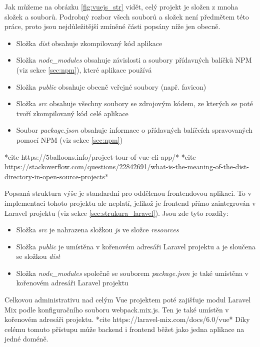 	Jak můžeme na obrázku \ref{fig:vuejs_str} vidět, celý projekt je složen z mnoha složek a souborů. Podrobný rozbor všech souborů a složek není předmětem této práce, proto jsou nejdůležitější zmíněné části popsány níže jen obecně.
	
	\begin{itemize}
		\item Složka \textit{dist} obsahuje zkompilovaný kód aplikace
		\item Složka \textit{node\_modules} obsahuje závislosti a soubory přídavných balíčků NPM (viz sekce \ref{sec:npm}), které aplikace používá
		\item Složka \textit{public} obsahuje obecně veřejné soubory (např. favicon)
		\item Složka \textit{src} obsahuje všechny soubory se zdrojovým kódem, ze kterých se poté tvoří zkompilovaný kód celé aplikace
		\item Soubor \textit{package.json} obsahuje informace o přídavných balíčcích spravovaných pomocí NPM (viz sekce \ref{sec:npm})
	\end{itemize}

	*cite https://5balloons.info/project-tour-of-vue-cli-app/*
	*cite https://stackoverflow.com/questions/22842691/what-is-the-meaning-of-the-dist-directory-in-open-source-projects*
	
	Popsaná struktura výše je standardní pro oddělenou frontendovou aplikaci. To v implementaci tohoto projektu ale neplatí, jelikož je frontend přímo zaintegrován v Laravel projektu (viz sekce \ref{sec:strukura_laravel}). Jsou zde tyto rozdíly:
	
	\begin{itemize}
		\item Složka \textit{src} je nahrazena složkou \textit{js} ve složce \textit{resources}
		\item Složka \textit{public} je umístěna v kořenovém adresáři Laravel projektu a je sloučena se složkou \textit{dist}
		\item Složka \textit{node\_modules} společně se souborem \textit{package.json} je také umístěna v kořenovém adresáři Laravel projektu
	\end{itemize}
	
	Celkovou administrativu nad celým Vue projektem poté zajišťuje modul Laravel Mix podle konfiguračního souboru webpack.mix.js. Ten je také umístěn v kořenovém adresáři projektu. *cite https://laravel-mix.com/docs/6.0/vue* Díky celému tomuto přístupu může backend i frontend běžet jako jedna aplikace na jedné doméně.
	
